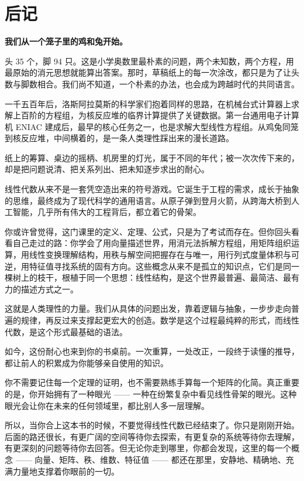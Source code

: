 \documentclass[a4paper,12pt,twoside,openany,fontset=none]{ctexbook}
\numberwithin{equation}{chapter}
\begin{document}
\chapter*{后记}
\linespread{1}\fontsize{11.5pt}{17.5pt}\selectfont
\setlength{\parindent}{2em}
\setlength{\parskip}{1pt}
 

\noindent\textbf{我们从一个笼子里的鸡和兔开始。}

头 35 个，脚 94 只。这是小学奥数里最朴素的问题，两个未知数，两个方程，用最原始的消元思想就能算出答案。那时，草稿纸上的每一次涂改，都只是为了让头数与脚数相合。我们尚不知道，一个朴素的办法，也会成为跨越时代的共同语言。

一千五百年后，洛斯阿拉莫斯的科学家们抱着同样的思路，在机械台式计算器上求解上百阶的方程组，为核反应堆的临界计算提供了关键数据。第一台通用电子计算机 ENIAC 建成后，最早的核心任务之一，也是求解大型线性方程组。从鸡兔同笼到核反应堆，中间横着的，是一条人类理性踩出来的漫长道路。

纸上的筹算、桌边的摇柄、机房里的灯光，属于不同的年代；被一次次传下来的，却是把问题说清、把关系列出、把未知逐步求出的耐心。

线性代数从来不是一套凭空造出来的符号游戏。它诞生于工程的需求，成长于抽象的思维，最终成为了现代科学的通用语言。从原子弹到登月火箭，从跨海大桥到人工智能，几乎所有伟大的工程背后，都立着它的骨架。

你或许曾觉得，这门课里的定义、定理、公式，只是为了考试而存在。但你回头看看自己走过的路：你学会了用向量描述世界，用消元法拆解方程组，用矩阵组织运算，用线性变换理解结构，用秩与解空间把握存在与唯一，用行列式度量体积与可逆，用特征值寻找系统的固有方向。这些概念从来不是孤立的知识点，它们是同一棵树上的枝干，根植于同一个思想：线性结构，是这个世界最普遍、最简洁、最有力的描述方式之一。

这就是人类理性的力量。我们从具体的问题出发，靠着逻辑与抽象，一步步走向普遍的规律，再反过来支撑起更宏大的创造。数学是这个过程最纯粹的形式，而线性代数，是这个形式最基础的语法。

如今，这份耐心也来到你的书桌前。一次重算，一处改正，一段终于读懂的推导，都让前人的积累成为你能够亲自使用的知识。

你不需要记住每一个定理的证明，也不需要熟练手算每一个矩阵的化简。真正重要的是，你开始拥有了一种眼光 —— 一种在纷繁复杂中看见线性骨架的眼光。这种眼光会让你在未来的任何领域里，都比别人多一层理解。

所以，当你合上这本书的时候，不要觉得线性代数已经结束了。你只是刚刚开始。后面的路还很长，有更广阔的空间等待你去探索，有更复杂的系统等待你去理解，有更深刻的问题等待你去回答。但无论你走到哪里，你都会发现，这里的每一个概念 —— 向量、矩阵、秩、维数、特征值 —— 都还在那里，安静地、精确地、充满力量地支撑着你眼前的一切。
\end{document}

